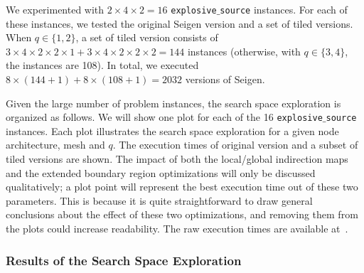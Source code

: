 We experimented with $2 \times 4 \times 2 = 16$ {\tt explosive$\_$source} instances. For each of these instances, we tested the original Seigen version and a set of tiled versions. When $q \in \lbrace 1, 2 \rbrace$, a set of tiled version consists of $3 \times 4 \times 2 \times 2 \times 1 + 3 \times 4 \times 2 \times 2 \times 2 = 144$ instances (otherwise, with $q \in \lbrace 3, 4 \rbrace$, the instances are 108). In total, we executed $8 \times (144 + 1) + 8 \times (108 + 1) = 2032$ versions of Seigen. 

Given the large number of problem instances, the search space exploration is organized as follows. We will show one plot for each of the 16 {\tt explosive$\_$source} instances. Each plot illustrates the search space exploration for a given node architecture, mesh and $q$. The execution times of original version and a subset of tiled versions are shown. The impact of both the local/global indirection maps and the extended boundary region optimizations will only be discussed qualitatively; a plot point will represent the best execution time out of these two parameters. This is because it is quite straightforward to draw general conclusions about the effect of these two optimizations, and removing them from the plots could increase readability. The raw execution times are available at~\cite{seigen-times-raw-values}.

\subsubsection{Results of the Search Space Exploration}

